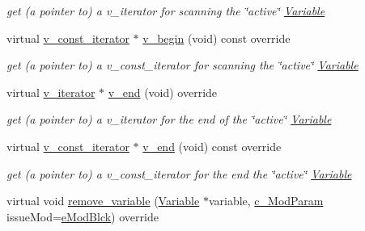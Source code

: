 \begin{Indent}
\begin{DoxyCompactItemize}
\begin{DoxyCompactList}\small\item\em get (a pointer to) a v\+\_\+iterator for scanning the \char`\"{}active\char`\"{} \mbox{\hyperlink{class_s_m_spp__di__unipi__it_1_1_variable}{Variable}} \end{DoxyCompactList}\item 
virtual \mbox{\hyperlink{class_s_m_spp__di__unipi__it_1_1_thin_var_dep_interface_1_1v__const__iterator}{v\+\_\+const\+\_\+iterator}} $\ast$ \mbox{\hyperlink{class_s_m_spp__di__unipi__it_1_1_f_row_constraint_a997de10fbae309ac6e357d7ad96a8052}{v\+\_\+begin}} (void) const override
\begin{DoxyCompactList}\small\item\em get (a pointer to) a v\+\_\+const\+\_\+iterator for scanning the \char`\"{}active\char`\"{} \mbox{\hyperlink{class_s_m_spp__di__unipi__it_1_1_variable}{Variable}} \end{DoxyCompactList}\item 
virtual \mbox{\hyperlink{class_s_m_spp__di__unipi__it_1_1_thin_var_dep_interface_1_1v__iterator}{v\+\_\+iterator}} $\ast$ \mbox{\hyperlink{class_s_m_spp__di__unipi__it_1_1_f_row_constraint_ad17303c6335cb94a9d32f1fce77501fd}{v\+\_\+end}} (void) override
\begin{DoxyCompactList}\small\item\em get (a pointer to) a v\+\_\+iterator for the end of the \char`\"{}active\char`\"{} \mbox{\hyperlink{class_s_m_spp__di__unipi__it_1_1_variable}{Variable}} \end{DoxyCompactList}\item 
virtual \mbox{\hyperlink{class_s_m_spp__di__unipi__it_1_1_thin_var_dep_interface_1_1v__const__iterator}{v\+\_\+const\+\_\+iterator}} $\ast$ \mbox{\hyperlink{class_s_m_spp__di__unipi__it_1_1_f_row_constraint_a17969277c912e791df025c9bebda3217}{v\+\_\+end}} (void) const override
\begin{DoxyCompactList}\small\item\em get (a pointer to) a v\+\_\+const\+\_\+iterator for the end the \char`\"{}active\char`\"{} \mbox{\hyperlink{class_s_m_spp__di__unipi__it_1_1_variable}{Variable}} \end{DoxyCompactList}\item 
virtual void \mbox{\hyperlink{class_s_m_spp__di__unipi__it_1_1_f_row_constraint_ade52d9ebf47de895377b860ef4d3a607}{remove\+\_\+variable}} (\mbox{\hyperlink{class_s_m_spp__di__unipi__it_1_1_variable}{Variable}} $\ast$variable, \mbox{\hyperlink{group___modification___t_y_p_e_s_ga544246d8c462e9a2d817c2c30797968f}{c\+\_\+\+Mod\+Param}} issue\+Mod=\mbox{\hyperlink{group___modification___t_y_p_e_s_gga48fddcdd03a03f49b7e389ca1ed938d4a21b14b26b1c0093a0905f6fc010bad29}{e\+Mod\+Blck}}) override

\end{DoxyCompactItemize}
\end{Indent}
